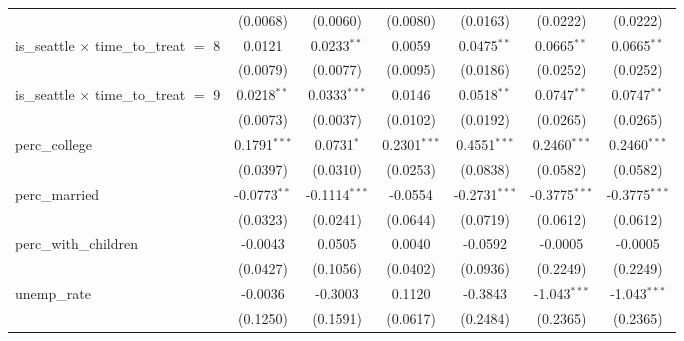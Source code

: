 \documentclass[A4paper,12pt]{article}
\begin{document}
\begin{appendices}
\begin{table}[ht]
{\begin{tabular}{lcccccc}
                                                   & (0.0068)       & (0.0060)        & (0.0080)              & (0.0163)        & (0.0222)        & (0.0222)\\   
   is\_seattle $\times$ time\_to\_treat $=$ 8      & 0.0121         & 0.0233$^{**}$   & 0.0059                & 0.0475$^{**}$   & 0.0665$^{**}$   & 0.0665$^{**}$\\   
                                                   & (0.0079)       & (0.0077)        & (0.0095)              & (0.0186)        & (0.0252)        & (0.0252)\\   
   is\_seattle $\times$ time\_to\_treat $=$ 9      & 0.0218$^{**}$  & 0.0333$^{***}$  & 0.0146                & 0.0518$^{**}$   & 0.0747$^{**}$   & 0.0747$^{**}$\\   
                                                   & (0.0073)       & (0.0037)        & (0.0102)              & (0.0192)        & (0.0265)        & (0.0265)\\   
   perc\_college                                   & 0.1791$^{***}$ & 0.0731$^{*}$    & 0.2301$^{***}$        & 0.4551$^{***}$  & 0.2460$^{***}$  & 0.2460$^{***}$\\   
                                                   & (0.0397)       & (0.0310)        & (0.0253)              & (0.0838)        & (0.0582)        & (0.0582)\\   
   perc\_married                                   & -0.0773$^{**}$ & -0.1114$^{***}$ & -0.0554               & -0.2731$^{***}$ & -0.3775$^{***}$ & -0.3775$^{***}$\\   
                                                   & (0.0323)       & (0.0241)        & (0.0644)              & (0.0719)        & (0.0612)        & (0.0612)\\   
   perc\_with\_children                            & -0.0043        & 0.0505          & 0.0040                & -0.0592         & -0.0005         & -0.0005\\   
                                                   & (0.0427)       & (0.1056)        & (0.0402)              & (0.0936)        & (0.2249)        & (0.2249)\\   
   unemp\_rate                                     & -0.0036        & -0.3003         & 0.1120                & -0.3843         & -1.043$^{***}$  & -1.043$^{***}$\\   
                                                   & (0.1250)       & (0.1591)        & (0.0617)              & (0.2484)        & (0.2365)        & (0.2365)\\   

\end{tabular}}
\end{table}
\end{appendices}
\end{document}

